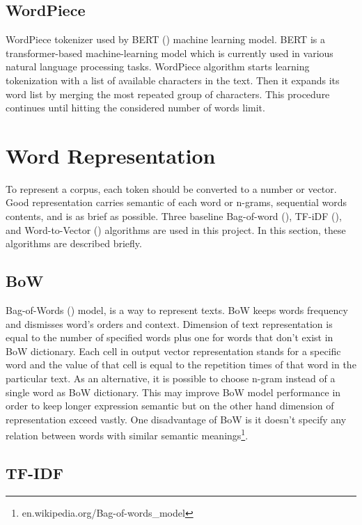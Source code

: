 \subsection{WordPiece}
WordPiece tokenizer used by BERT (\cite{bert}) machine learning model. BERT is a transformer-based machine-learning model which is currently used in various natural language processing tasks. WordPiece algorithm starts learning tokenization with a list of available characters in the text. Then it expands its word list by merging the most repeated group of characters. This procedure continues until hitting the considered number of words limit. 

\section{Word Representation}
\label{lr:wordrep}
To represent a corpus, each token should be converted to a number or vector. Good representation carries semantic of each word or n-grams, sequential words contents, and is as brief as possible. Three baseline Bag-of-word (\cite{bow}), TF-iDF (\cite{tfidf}), and Word-to-Vector (\cite{word2vec}) algorithms are used in this project. In this section, these algorithms are described briefly.
\subsection{BoW}
Bag-of-Words (\cite{bow}) model, is a way to represent texts. BoW keeps words frequency and dismisses word's orders and context. Dimension of text representation is equal to the number of specified words plus one for words that don't exist in BoW dictionary. Each cell in output vector representation stands for a specific word and the value of that cell is equal to the repetition times of that word in the particular text. As an alternative, it is possible to choose n-gram instead of a single word as BoW dictionary. This may improve BoW model performance in order to keep longer expression semantic but on the other hand dimension of representation exceed vastly. One disadvantage of BoW is it doesn't specify any relation between words with similar semantic meanings\footnote{en.wikipedia.org/Bag-of-words\_model}. 

\subsection{TF-IDF}

